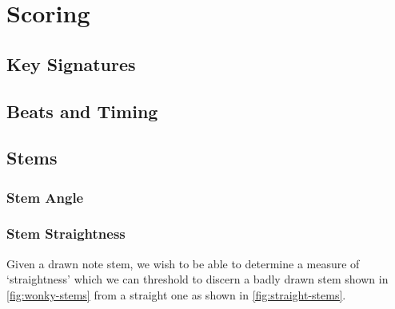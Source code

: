 \section{Scoring}

\subsection{Key Signatures}

\subsection{Beats and Timing}

\subsection{Stems}

\subsubsection{Stem Angle}


\subsubsection{Stem Straightness}

Given a drawn note stem, we wish to be able to determine a measure of `straightness' which we can threshold to discern a badly drawn stem shown in \cref{fig:wonky-stems} from a straight one  as shown in \cref{fig:straight-stems}.

